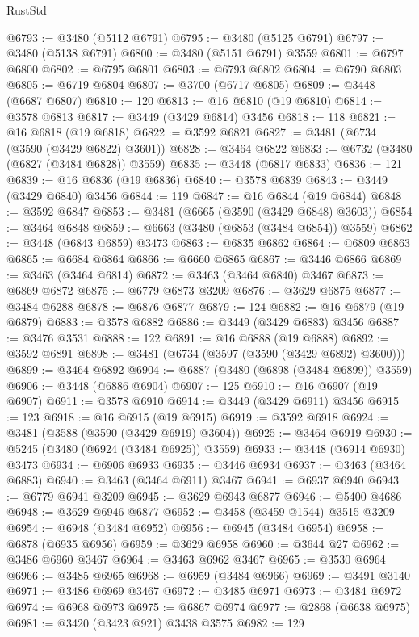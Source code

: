 \begin{lexlean}{RustStd}
\begin{coremodule}
{\begin{coremodule}
{{{{{{{{{{{{{{{{{{{{{{{{{{{{{{{{{{{{{{{{{{{{{{{{{{{{{{{{{{{{{{{{{{{{{{{{{{{{{{{{{{{{{@6793 := @3480 (@5112 @6791)
@6795 := @3480 (@5125 @6791)
@6797 := @3480 (@5138 @6791)
@6800 := @3480 (@5151 @6791) @3559
@6801 := @6797 @6800
@6802 := @6795 @6801
@6803 := @6793 @6802
@6804 := @6790 @6803
@6805 := @6719 @6804
@6807 := @3700 (@6717 @6805)
@6809 := @3448 (@6687 @6807)
@6810 := 120
@6813 := @16 @6810 (@19 @6810)
@6814 := @3578 @6813
@6817 := @3449 (@3429 @6814) @3456
@6818 := 118
@6821 := @16 @6818 (@19 @6818)
@6822 := @3592 @6821
@6827 := @3481 (@6734 (@3590 (@3429 @6822) @3601))
@6828 := @3464 @6822
@6833 := @6732 (@3480 (@6827 (@3484 @6828)) @3559)
@6835 := @3448 (@6817 @6833)
@6836 := 121
@6839 := @16 @6836 (@19 @6836)
@6840 := @3578 @6839
@6843 := @3449 (@3429 @6840) @3456
@6844 := 119
@6847 := @16 @6844 (@19 @6844)
@6848 := @3592 @6847
@6853 := @3481 (@6665 (@3590 (@3429 @6848) @3603))
@6854 := @3464 @6848
@6859 := @6663 (@3480 (@6853 (@3484 @6854)) @3559)
@6862 := @3448 (@6843 @6859) @3473
@6863 := @6835 @6862
@6864 := @6809 @6863
@6865 := @6684 @6864
@6866 := @6660 @6865
@6867 := @3446 @6866
@6869 := @3463 (@3464 @6814)
@6872 := @3463 (@3464 @6840) @3467
@6873 := @6869 @6872
@6875 := @6779 @6873 @3209
@6876 := @3629 @6875
@6877 := @3484 @6288
@6878 := @6876 @6877
@6879 := 124
@6882 := @16 @6879 (@19 @6879)
@6883 := @3578 @6882
@6886 := @3449 (@3429 @6883) @3456
@6887 := @3476 @3531
@6888 := 122
@6891 := @16 @6888 (@19 @6888)
@6892 := @3592 @6891
@6898 := @3481 (@6734 (@3597 (@3590 (@3429 @6892) @3600)))
@6899 := @3464 @6892
@6904 := @6887 (@3480 (@6898 (@3484 @6899)) @3559)
@6906 := @3448 (@6886 @6904)
@6907 := 125
@6910 := @16 @6907 (@19 @6907)
@6911 := @3578 @6910
@6914 := @3449 (@3429 @6911) @3456
@6915 := 123
@6918 := @16 @6915 (@19 @6915)
@6919 := @3592 @6918
@6924 := @3481 (@3588 (@3590 (@3429 @6919) @3604))
@6925 := @3464 @6919
@6930 := @5245 (@3480 (@6924 (@3484 @6925)) @3559)
@6933 := @3448 (@6914 @6930) @3473
@6934 := @6906 @6933
@6935 := @3446 @6934
@6937 := @3463 (@3464 @6883)
@6940 := @3463 (@3464 @6911) @3467
@6941 := @6937 @6940
@6943 := @6779 @6941 @3209
@6945 := @3629 @6943 @6877
@6946 := @5400 @4686
@6948 := @3629 @6946 @6877
@6952 := @3458 (@3459 @1544) @3515 @3209
@6954 := @6948 (@3484 @6952)
@6956 := @6945 (@3484 @6954)
@6958 := @6878 (@6935 @6956)
@6959 := @3629 @6958
@6960 := @3644 @27
@6962 := @3486 @6960 @3467
@6964 := @3463 @6962 @3467
@6965 := @3530 @6964
@6966 := @3485 @6965
@6968 := @6959 (@3484 @6966)
@6969 := @3491 @3140
@6971 := @3486 @6969 @3467
@6972 := @3485 @6971
@6973 := @3484 @6972
@6974 := @6968 @6973
@6975 := @6867 @6974
@6977 := @2868 (@6638 @6975)
@6981 := @3420 (@3423 @921) @3438 @3575
@6982 := 129
}}}}}}}}}}}}}}}}}}}}}}}}}}}}}}}}}}}}}}}}}}}}}}}}}}}}}}}}}}}}}}}}}}}}}}}}}}}}}}}}}}}}}
\end{coremodule}}
\end{coremodule}
\end{lexlean}

